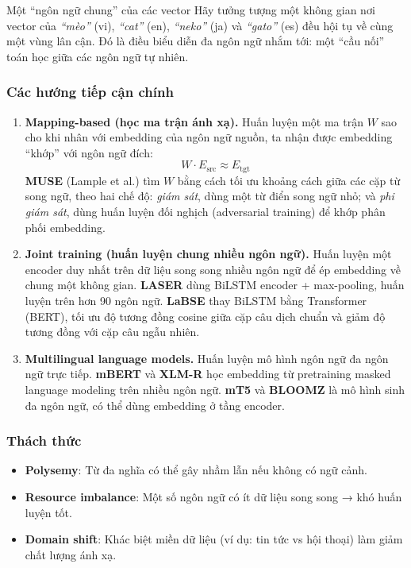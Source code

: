 \begin{keyidea}{Một “ngôn ngữ chung” của các vector}
	Hãy tưởng tượng một không gian nơi vector của \textit{“mèo”} (vi), \textit{“cat”} (en), \textit{“neko”} (ja) và \textit{“gato”} (es) đều hội tụ về cùng một vùng lân cận. Đó là điều biểu diễn đa ngôn ngữ nhắm tới: một “cầu nối” toán học giữa các ngôn ngữ tự nhiên.
\end{keyidea}

\subsubsection*{Các hướng tiếp cận chính}
\begin{enumerate}
	\item \textbf{Mapping-based (học ma trận ánh xạ).}
	Huấn luyện một ma trận $W$ sao cho khi nhân với embedding của ngôn ngữ nguồn, ta nhận được embedding “khớp” với ngôn ngữ đích:
	\[
	W \cdot E_{\text{src}} \approx E_{\text{tgt}}
	\]
	\textbf{MUSE} (Lample et al.) tìm $W$ bằng cách tối ưu khoảng cách giữa các cặp từ song ngữ, theo hai chế độ: \textit{giám sát}, dùng một từ điển song ngữ nhỏ; và \textit{phi giám sát}, dùng huấn luyện đối nghịch (adversarial training) để khớp phân phối embedding.

	\item \textbf{Joint training (huấn luyện chung nhiều ngôn ngữ).}
	Huấn luyện một encoder duy nhất trên dữ liệu song song nhiều ngôn ngữ để ép embedding về chung một không gian. \textbf{LASER} dùng BiLSTM encoder + max-pooling, huấn luyện trên hơn 90 ngôn ngữ. \textbf{LaBSE} thay BiLSTM bằng Transformer (BERT), tối ưu độ tương đồng cosine giữa cặp câu dịch chuẩn và giảm độ tương đồng với cặp câu ngẫu nhiên.

	\item \textbf{Multilingual language models.}
	Huấn luyện mô hình ngôn ngữ đa ngôn ngữ trực tiếp. \textbf{mBERT} và \textbf{XLM-R} học embedding từ pretraining masked language modeling trên nhiều ngôn ngữ. \textbf{mT5} và \textbf{BLOOMZ} là mô hình sinh đa ngôn ngữ, có thể dùng embedding ở tầng encoder.
\end{enumerate}

\subsubsection*{Thách thức}
\begin{itemize}
	\item \textbf{Polysemy}: Từ đa nghĩa có thể gây nhầm lẫn nếu không có ngữ cảnh.
	\item \textbf{Resource imbalance}: Một số ngôn ngữ có ít dữ liệu song song → khó huấn luyện tốt.
	\item \textbf{Domain shift}: Khác biệt miền dữ liệu (ví dụ: tin tức vs hội thoại) làm giảm chất lượng ánh xạ.
\end{itemize}

